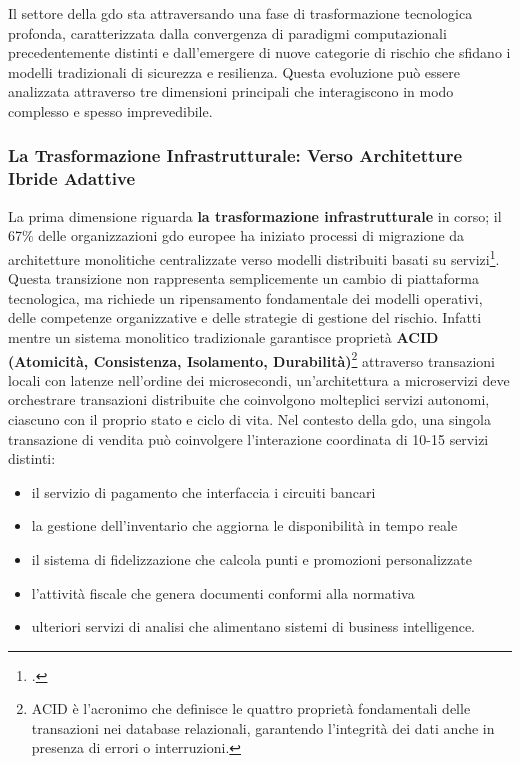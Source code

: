 Il settore della \gls{gdo} sta attraversando una fase di trasformazione tecnologica profonda, caratterizzata dalla convergenza di paradigmi computazionali precedentemente distinti e dall'emergere di nuove categorie di rischio che sfidano i modelli tradizionali di sicurezza e resilienza. Questa evoluzione può essere analizzata attraverso tre dimensioni principali che interagiscono in modo complesso e spesso imprevedibile.

\subsubsection{\texorpdfstring{\textbf{La Trasformazione Infrastrutturale: Verso Architetture Ibride Adattive}}{1.1.2.1 - La Trasformazione Infrastrutturale: Verso Architetture Ibride Adattive}}

La prima dimensione riguarda \textbf{la trasformazione infrastrutturale} in corso; il 67\% delle organizzazioni \gls{gdo} europee ha iniziato processi di migrazione da architetture monolitiche centralizzate verso modelli distribuiti basati su servizi\footcite{gartner2024cloud}. Questa transizione non rappresenta semplicemente un cambio di piattaforma tecnologica, ma richiede un ripensamento fondamentale dei modelli operativi, delle competenze organizzative e delle strategie di gestione del rischio. Infatti mentre un sistema monolitico tradizionale garantisce proprietà \textbf{ACID (Atomicità, Consistenza, Isolamento, Durabilità)}\footnote{ACID è l'acronimo che definisce le quattro proprietà fondamentali delle transazioni nei database relazionali, garantendo l'integrità dei dati 
anche in presenza di errori o interruzioni.} attraverso transazioni locali con latenze nell'ordine dei microsecondi, un'architettura a microservizi deve orchestrare transazioni distribuite che coinvolgono molteplici servizi autonomi, ciascuno con il proprio stato e ciclo di vita. 
Nel contesto della \gls{gdo}, una singola transazione di vendita può coinvolgere l'interazione coordinata di 10-15 servizi distinti: 
\begin{itemize}
    \item il servizio di pagamento che interfaccia i circuiti bancari
    \item la gestione dell'inventario che aggiorna le disponibilità in tempo reale
    \item il sistema di fidelizzazione che calcola punti e promozioni personalizzate
    \item l'attività fiscale che genera documenti conformi alla normativa
    \item ulteriori servizi di analisi che alimentano sistemi di business intelligence.
\end{itemize}
